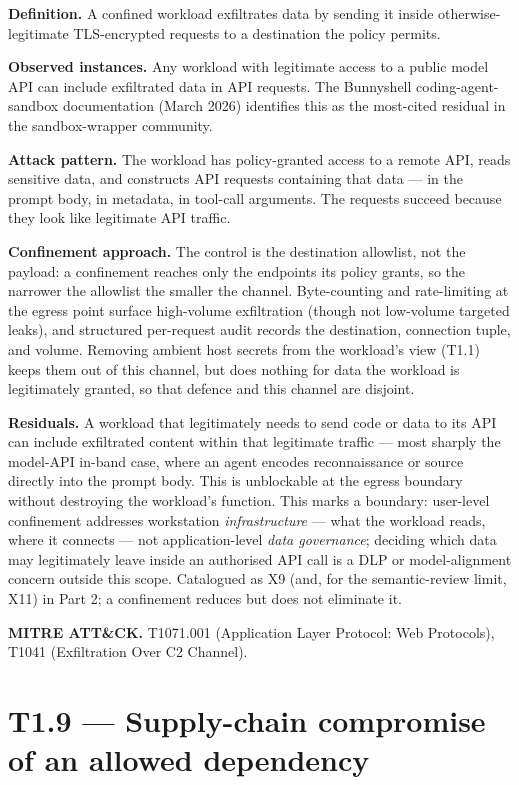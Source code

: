\textbf{Definition.} A confined workload exfiltrates data by sending it
inside otherwise-legitimate TLS-encrypted requests to a destination the
policy permits.

\textbf{Observed instances.} Any workload with legitimate access to a
public model API can include exfiltrated data in API requests. The
Bunnyshell coding-agent-sandbox documentation (March 2026) identifies
this as the most-cited residual in the sandbox-wrapper community.

\textbf{Attack pattern.} The workload has policy-granted access to a
remote API, reads sensitive data, and constructs API requests containing
that data --- in the prompt body, in metadata, in tool-call arguments.
The requests succeed because they look like legitimate API traffic.

\textbf{Confinement approach.} The control is the destination allowlist,
not the payload: a confinement reaches only the endpoints its policy
grants, so the narrower the allowlist the smaller the channel.
Byte-counting and rate-limiting at the egress point surface high-volume
exfiltration (though not low-volume targeted leaks), and structured
per-request audit records the destination, connection tuple, and volume.
Removing ambient host secrets from the workload's view (T1.1) keeps them
out of this channel, but does nothing for data the workload is
legitimately granted, so that defence and this channel are disjoint.

\textbf{Residuals.} A workload that legitimately needs to send code or
data to its API can include exfiltrated content within that legitimate
traffic --- most sharply the model-API in-band case, where an agent
encodes reconnaissance or source directly into the prompt body. This is
unblockable at the egress boundary without destroying the workload's
function. This marks a boundary: user-level confinement addresses
workstation \emph{infrastructure} --- what the workload reads, where it
connects --- not application-level \emph{data governance}; deciding
which data may legitimately leave inside an authorised API call is a DLP
or model-alignment concern outside this scope. Catalogued as X9 (and,
for the semantic-review limit, X11) in Part 2; a confinement reduces but
does not eliminate it.

\textbf{MITRE ATT\&CK.} T1071.001 (Application Layer Protocol: Web
Protocols), T1041 (Exfiltration Over C2 Channel).

\hypertarget{t1.9-supply-chain-compromise-of-an-allowed-dependency}{%
\section{T1.9 --- Supply-chain compromise of an allowed
dependency}\label{t1.9-supply-chain-compromise-of-an-allowed-dependency}}

